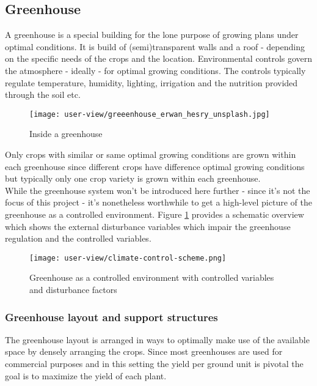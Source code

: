 \graphicspath{{members/ssr/figures/}}

\subsection{Greenhouse}\label{subsec:greenhouse}

A greenhouse is a special building for the lone purpose of growing plans under optimal
conditions.
It is build of (semi)transparent walls and a roof - depending on the specific
needs of the crops and the location.
Environmental controls govern the atmosphere - ideally - for optimal growing conditions.
The controls typically regulate temperature, humidity, lighting, irrigation and the
nutrition provided through the soil etc.\\

\begin{figure}[H]
    \centering
    \texttt{[image: user-view/greeenhouse\_erwan\_hesry\_unsplash.jpg]}
    \caption{Inside a greenhouse}
\end{figure}

Only crops with similar or same optimal growing conditions are grown within each greenhouse
since different crops have difference optimal growing conditions but typically only one crop
variety is grown within each greenhouse.\\

While the greenhouse system won't be introduced here further - since it's not the focus
of this project - it's nonetheless worthwhile to get a high-level picture of the
greenhouse as a controlled environment.
Figure \ref{fig:scheme:greenhouse} provides a schematic overview which shows the external
disturbance variables which impair the greenhouse regulation and the controlled variables.

\begin{figure}[H]
    \centering
    \texttt{[image: user-view/climate-control-scheme.png]}
    \caption{Greenhouse as a controlled environment with controlled variables and disturbance factors \cite{rod:greenhouse}}
    \label{fig:scheme:greenhouse}
\end{figure}

\subsubsection*{Greenhouse layout and support structures}

The greenhouse layout is arranged in ways to optimally make use of the available space by densely
arranging the crops.
Since most greenhouses are used for commercial purposes and in this setting the yield per ground
unit is pivotal the goal is to maximize the yield of each plant.\\

